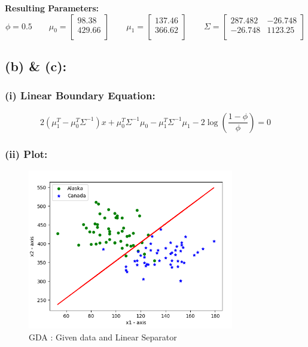 \documentclass[a4 paper]{article}
\begin{document}
\textbf{Resulting Parameters:}
$$ \phi = 0.5 \quad \quad
\mu_0 = 
\begin{bmatrix}
	98.38 \\ 429.66\\
\end{bmatrix} \quad \quad
\mu_1 = 
\begin{bmatrix}
	137.46 \\ 366.62 \\ 
\end{bmatrix} \quad \quad
\Sigma = 
\begin{bmatrix}
	287.482 & -26.748 \\ 
    -26.748 & 1123.25  \\
\end{bmatrix} $$

\subsection*{(b) \& (c):}
\subsubsection*{(i) Linear Boundary Equation:}

	$$ 2(\mu_1^T - \mu_0^T\Sigma^{-1})x + \mu_0^T \Sigma^{-1} \mu_0 - \mu_1^T \Sigma^{-1} \mu_1 - 2\log\left(\frac{1-\phi}{\phi}\right) = 0$$

\vspace*{-0.5cm}
\subsubsection*{(ii) Plot:}
\vspace*{-0.7cm}
\begin{figure}[H]
	\centering
	  \includegraphics[width = 90mm]{./Plots/4a.png}
	  \caption{GDA : Given data and Linear Separator}
  	\label{fig8}
\end{figure}
\end{document}
